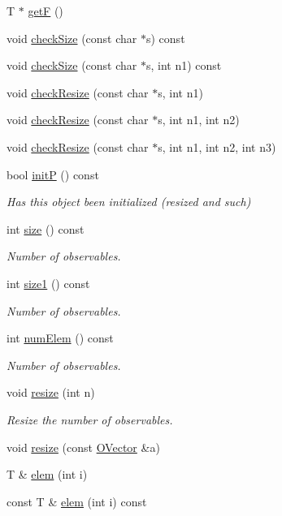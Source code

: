 \begin{DoxyCompactItemize}
T $\ast$ \mbox{\hyperlink{classENSEM_1_1OVector_a73065fd6ed2149ce8699996d691c4c42}{getF}} ()
\item 
void \mbox{\hyperlink{classENSEM_1_1OVector_a12d09a71bb2808a7404578da9ba41c4f}{check\+Size}} (const char $\ast$s) const
\item 
void \mbox{\hyperlink{classENSEM_1_1OVector_a1446ad09778db3a287fb5f6fec304b22}{check\+Size}} (const char $\ast$s, int n1) const
\item 
void \mbox{\hyperlink{classENSEM_1_1OVector_a95545451bb9d6be83ba32ad3dc2dab42}{check\+Resize}} (const char $\ast$s, int n1)
\item 
void \mbox{\hyperlink{classENSEM_1_1OVector_acd8960fbc5b7df8aabf14ca8ca50f7ab}{check\+Resize}} (const char $\ast$s, int n1, int n2)
\item 
void \mbox{\hyperlink{classENSEM_1_1OVector_ac909025f6c5d78479f5dcbef8151d571}{check\+Resize}} (const char $\ast$s, int n1, int n2, int n3)
\item 
bool \mbox{\hyperlink{classENSEM_1_1OVector_ae1c9e62826d9b61edc7f85d8f8aedf79}{initP}} () const
\begin{DoxyCompactList}\small\item\em Has this object been initialized (resized and such) \end{DoxyCompactList}\item 
int \mbox{\hyperlink{classENSEM_1_1OVector_a715979c319905eb60532815bb3c77aab}{size}} () const
\begin{DoxyCompactList}\small\item\em Number of observables. \end{DoxyCompactList}\item 
int \mbox{\hyperlink{classENSEM_1_1OVector_af2035852c6cefe80834b8e2a17648113}{size1}} () const
\begin{DoxyCompactList}\small\item\em Number of observables. \end{DoxyCompactList}\item 
int \mbox{\hyperlink{classENSEM_1_1OVector_a77771968912766dab2f1bd6ed7ccc876}{num\+Elem}} () const
\begin{DoxyCompactList}\small\item\em Number of observables. \end{DoxyCompactList}\item 
void \mbox{\hyperlink{classENSEM_1_1OVector_a2758b982bf7fa25b69d31fe8d7f72762}{resize}} (int n)
\begin{DoxyCompactList}\small\item\em Resize the number of observables. \end{DoxyCompactList}\item 
void \mbox{\hyperlink{classENSEM_1_1OVector_a64fa4ad4d58dd32268c2bea8be1de212}{resize}} (const \mbox{\hyperlink{classENSEM_1_1OVector}{O\+Vector}} \&a)
\item 
T \& \mbox{\hyperlink{classENSEM_1_1OVector_a8d84b5c1145d0647107413d254450417}{elem}} (int i)
\item 
const T \& \mbox{\hyperlink{classENSEM_1_1OVector_afddf0b325b50484d1c8f0ab8f0abd3c8}{elem}} (int i) const
\end{DoxyCompactItemize}


